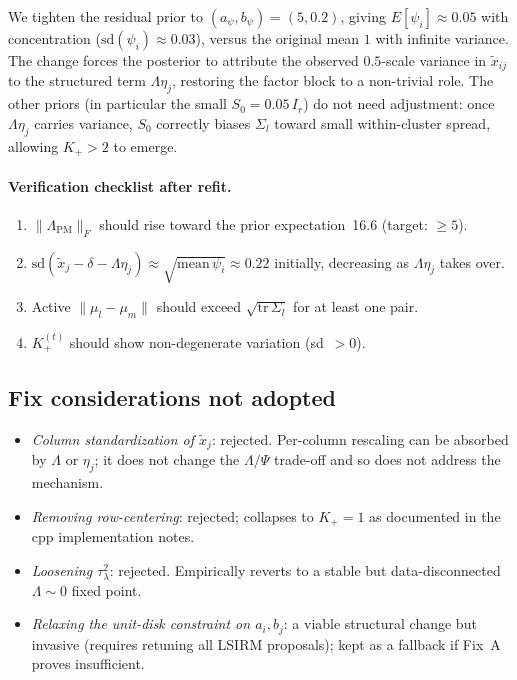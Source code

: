 \documentclass[11pt]{article}
\begin{document}
We tighten the residual prior to $(a_\psi,b_\psi)=(5,0.2)$, giving
$E[\psi_i]\approx 0.05$ with concentration ($\mathrm{sd}(\psi_i)\approx 0.03$), versus the original mean $1$ with infinite variance.
The change forces the posterior to attribute the observed $0.5$-scale variance in $\widetilde x_{ij}$ to the structured term $\Lambda\eta_j$, restoring the factor block to a non-trivial role.
The other priors (in particular the small $S_0=0.05\,I_r$) do not need adjustment: once $\Lambda\eta_j$ carries variance, $S_0$ correctly biases $\Sigma_l$ toward small within-cluster spread, allowing $K_+>2$ to emerge.

\paragraph{Verification checklist after refit.}
\begin{enumerate}[leftmargin=2em]
    \item $\|\Lambda_{\mathrm{PM}}\|_F$ should rise toward the prior expectation~16.6 (target: $\geq 5$).
    \item $\mathrm{sd}(\widetilde x_j-\delta-\Lambda\eta_j)\approx \sqrt{\mathrm{mean}\,\psi_i}\approx 0.22$ initially, decreasing as $\Lambda\eta_j$ takes over.
    \item Active $\|\mu_l-\mu_m\|$ should exceed $\sqrt{\mathrm{tr}\,\Sigma_l}$ for at least one pair.
    \item $K_+^{(t)}$ should show non-degenerate variation (sd~$>0$).
\end{enumerate}

\subsection{Fix considerations not adopted}

\begin{itemize}[leftmargin=1.5em]
    \item \emph{Column standardization of $\widetilde x_j$}: rejected. Per-column rescaling can be absorbed by $\Lambda$ or $\eta_j$; it does not change the $\Lambda/\Psi$ trade-off and so does not address the mechanism.
    \item \emph{Removing row-centering}: rejected; collapses to $K_+=1$ as documented in the cpp implementation notes.
    \item \emph{Loosening $\tau_\lambda^2$}: rejected. Empirically reverts to a stable but data-disconnected $\Lambda\sim 0$ fixed point.
    \item \emph{Relaxing the unit-disk constraint on $a_i,b_j$}: a viable structural change but invasive (requires retuning all LSIRM proposals); kept as a fallback if Fix~A proves insufficient.
\end{itemize}
\end{document}
